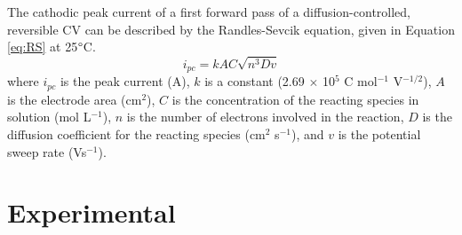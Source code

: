 \documentclass{article}
\begin{document}
\begin{multicols}{2}
{The cathodic peak current of a first forward pass of a diffusion-controlled,
reversible CV can be described by the Randles-Sevcik equation, given in Equation
\ref{eq:RS} at 25$\degree$C.
\begin{equation}
    i_{pc} = kAC\sqrt{n^3Dv} 
    \label{eq:RS}
\end{equation}
where $i_{pc}$ is the peak current (A), $k$ is a constant (2.69 $\times$ 10$^5$
C mol$^{-1}$ V$^{-1/2}$), $A$ is the electrode area (cm$^2$), $C$ is the
concentration of the reacting species in solution (mol L$^{-1}$), $n$ is the
number of electrons involved in the reaction, $D$ is the diffusion coefficient
for the reacting species (cm$^2$ s$^{-1}$), and $v$ is the potential sweep rate
(Vs$^{-1}$).

\section*{Experimental}
}
\end{multicols}
\end{document}
